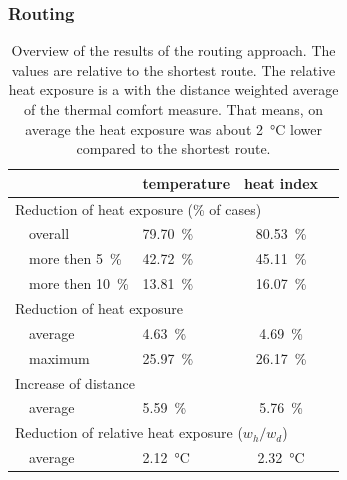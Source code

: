 \subsubsection{Routing}

\begin{table}
	\centering
	\begin{tabular}{lp{8cm}lcc}
		\hline
		& & temperature & heat index \\
		\hline
		\multicolumn{4}{l}{Reduction of heat exposure (\% of cases) }   \\
		& overall  & \SI{79.70}{\percent} & \SI{80.53}{\percent}  \\
		& more then \SI{5}{\percent} & \SI{42.72}{\percent} & \SI{45.11}{\percent} \\
		& more then \SI{10}{\percent} & \SI{13.81}{\percent} & \SI{16.07}{\percent} \\
		\multicolumn{4}{l}{Reduction of heat exposure}  \\
		& average  & \SI{4.63}{\percent} & \SI{4.69}{\percent}  \\
		& maximum  & \SI{25.97}{\percent} & \SI{26.17 }{\percent}  \\
		\multicolumn{4}{l}{Increase of distance}  \\
		& average & \SI{5.59}{\percent} & \SI{5.76}{\percent}  \\
		\multicolumn{4}{l}{Reduction of relative heat exposure ($w_h / w_d$)}  \\
		& average  & \SI{2.12}{\celsius} & \SI{2.32}{\celsius}  \\
		\hline
	\end{tabular}
	\caption{Overview of the results of the routing approach. The values are relative to the shortest route. The relative heat exposure is a with the distance weighted average of the thermal comfort measure. That means, on average the heat exposure was about \SI{2}{\celsius} lower compared to the shortest route. \label{tab:results-routing}}
\end{table}


